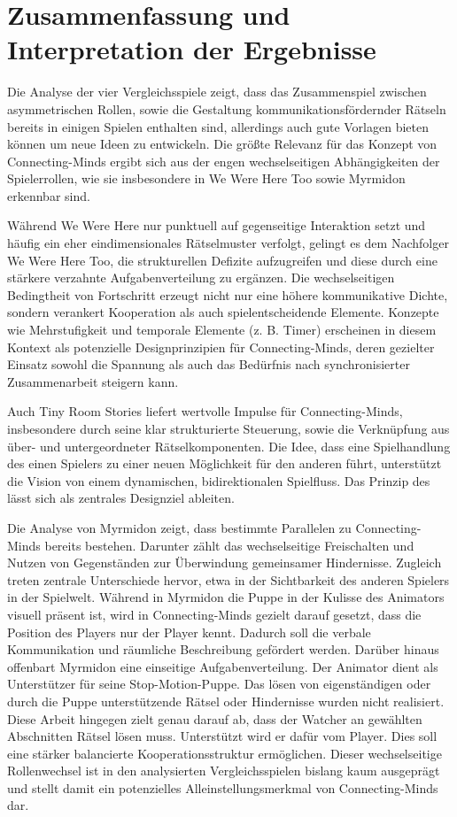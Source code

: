 \section{Zusammenfassung und Interpretation der Ergebnisse}
Die Analyse der vier Vergleichsspiele zeigt, dass das Zusammenspiel zwischen asymmetrischen Rollen, sowie die Gestaltung kommunikationsfördernder Rätseln  bereits in einigen Spielen enthalten sind, allerdings auch gute Vorlagen bieten können um neue Ideen zu entwickeln.
Die größte Relevanz für das Konzept von Connecting-Minds ergibt sich aus der engen wechselseitigen Abhängigkeiten der Spielerrollen, wie sie insbesondere in We Were Here Too sowie Myrmidon erkennbar sind.

Während We Were Here nur punktuell auf gegenseitige Interaktion setzt und häufig ein eher eindimensionales Rätselmuster verfolgt, gelingt es dem Nachfolger We Were Here Too, die strukturellen Defizite aufzugreifen und diese durch eine stärkere verzahnte Aufgabenverteilung zu ergänzen. Die wechselseitigen Bedingtheit von Fortschritt erzeugt nicht nur eine höhere kommunikative Dichte, sondern verankert Kooperation als auch spielentscheidende Elemente. Konzepte wie Mehrstufigkeit und temporale Elemente (z. B. Timer) erscheinen in diesem Kontext als potenzielle Designprinzipien für Connecting-Minds, deren gezielter Einsatz sowohl die Spannung als auch das Bedürfnis nach synchronisierter Zusammenarbeit steigern kann.

Auch Tiny Room Stories liefert wertvolle Impulse für Connecting-Minds, insbesondere durch seine klar strukturierte Steuerung, sowie die Verknüpfung aus über- und untergeordneter Rätselkomponenten. Die Idee, dass eine Spielhandlung des einen Spielers zu einer neuen Möglichkeit für den anderen führt, unterstützt die Vision von einem dynamischen, bidirektionalen Spielfluss. Das Prinzip des  lässt sich als zentrales Designziel ableiten.

Die Analyse von Myrmidon zeigt, dass bestimmte Parallelen zu Connecting-Minds bereits bestehen. Darunter zählt das wechselseitige Freischalten und Nutzen von Gegenständen zur Überwindung gemeinsamer Hindernisse. Zugleich treten zentrale Unterschiede hervor, etwa in der Sichtbarkeit des anderen Spielers in der Spielwelt. Während in Myrmidon die Puppe in der Kulisse des Animators visuell präsent ist, wird in Connecting-Minds gezielt darauf gesetzt, dass die Position des Players nur der Player kennt. Dadurch soll die verbale Kommunikation und räumliche Beschreibung gefördert werden.
Darüber hinaus offenbart Myrmidon eine einseitige Aufgabenverteilung. Der Animator dient als Unterstützer für seine Stop-Motion-Puppe. Das lösen von eigenständigen oder durch die Puppe unterstützende Rätsel oder Hindernisse wurden nicht realisiert. Diese Arbeit hingegen zielt genau darauf ab, dass der Watcher an gewählten Abschnitten Rätsel lösen muss. Unterstützt wird er dafür vom Player. Dies soll eine stärker balancierte Kooperationsstruktur ermöglichen. Dieser wechselseitige Rollenwechsel ist in den analysierten Vergleichsspielen bislang kaum ausgeprägt und stellt damit ein potenzielles Alleinstellungsmerkmal von Connecting-Minds dar.


